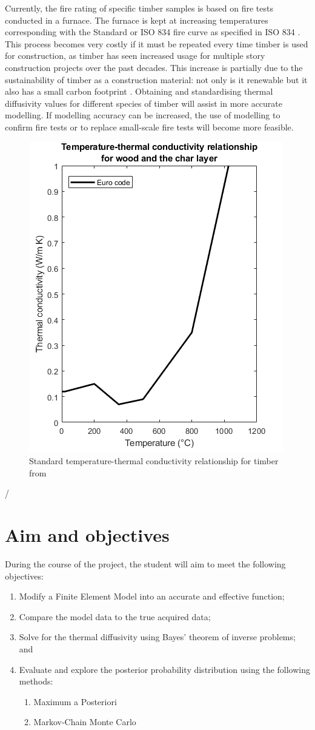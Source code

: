 Currently, the fire rating of specific timber samples is based on fire tests conducted in a furnace. 
The furnace is kept at increasing temperatures corresponding with the Standard or ISO 834 fire curve as specified in ISO 834 \citet{ISO:1999}.
This process becomes very costly if it must be repeated every time timber is used for construction, as timber has seen increased usage for multiple story construction projects over the past decades. 
This increase is partially due to the sustainability of timber as a construction material: not only is it renewable but it also has a small carbon footprint \citep{Salvadori:2017}.
Obtaining and standardising thermal diffusivity values for different species of timber will assist in more accurate modelling.
If modelling accuracy can be increased, the use of modelling to confirm fire tests or to replace small-scale fire tests will become more feasible.

	\begin{figure}
	\label{kvalue_fig}
	\centering
	\includegraphics[width = 0.5\linewidth]{figures/Eurok.png}
	\caption{Standard temperature-thermal conductivity relationship for timber from \citep{Euro:2004}}
	\end{figure}/
	
	

\section{Aim and objectives}
During the course of the project, the student will aim to meet the following objectives:
\begin{enumerate}
 \item Modify a Finite Element Model into an accurate and effective function;
 \item Compare the model data to the true acquired data;
 \item Solve for the thermal diffusivity using Bayes' theorem of inverse problems; and
 \item Evaluate and explore the posterior probability distribution using the following methods:
 	\begin{enumerate}
 		\item Maximum a Posteriori
 		\item Markov-Chain Monte Carlo 	
 	\end{enumerate}
\end{enumerate}


